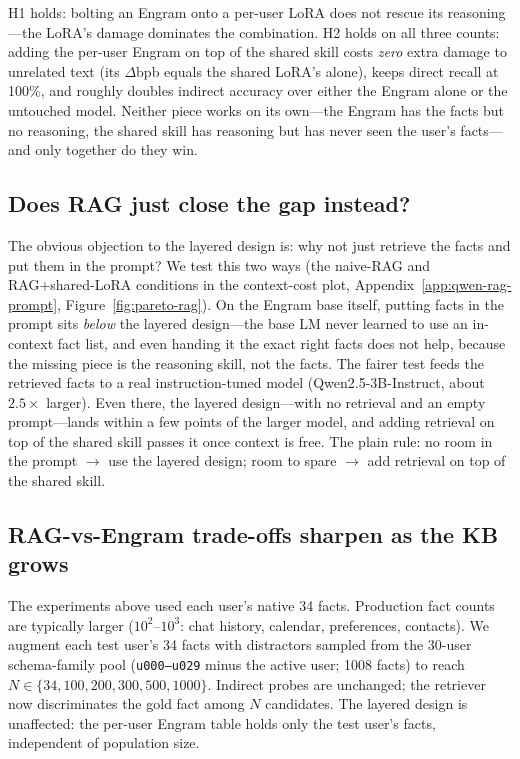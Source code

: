 \documentclass[11pt]{article}
\begin{document}
H1 holds: bolting an Engram onto a per-user LoRA does not rescue its
reasoning---the LoRA's damage dominates the combination. H2 holds on
all three counts: adding the per-user Engram on top of the shared
skill costs \emph{zero} extra damage to unrelated text (its
$\Delta$bpb equals the shared LoRA's alone), keeps direct recall at
100\%, and roughly doubles indirect accuracy over either the Engram
alone or the untouched model. Neither piece works on its own---the
Engram has the facts but no reasoning, the shared skill has reasoning
but has never seen the user's facts---and only together do they win.

\subsection{Does RAG just close the gap instead?}
\label{sec:layered-rag}
\label{sec:qwen-rag}

The obvious objection to the layered design is: why not just
retrieve the facts and put them in the prompt? We test this two ways
(the naive-RAG and RAG+shared-LoRA conditions in the context-cost
plot, Appendix~\ref{app:qwen-rag-prompt}, Figure~\ref{fig:pareto-rag}). On
the Engram base itself, putting facts in the prompt sits
\emph{below} the layered design---the base LM never learned to use
an in-context fact list, and even
handing it the exact right facts does not help, because the missing
piece is the reasoning skill, not the facts. The fairer test feeds the
retrieved facts to a real instruction-tuned model
(Qwen2.5-3B-Instruct, about $2.5\times$ larger). Even there, the
layered design---with no retrieval and an empty prompt---lands within
a few points of the larger model, and adding retrieval on top of the
shared skill passes it once context is free. The plain rule: no
room in the prompt $\to$ use the layered design; room to spare $\to$
add retrieval on top of the shared skill.

\subsection{RAG-vs-Engram trade-offs sharpen as the KB grows}
\label{sec:rag-scale}

The experiments above used each user's native 34 facts. Production fact counts are
typically larger ($10^2$--$10^3$: chat history, calendar,
preferences, contacts). We augment each test user's 34 facts
with distractors sampled from the 30-user schema-family pool
(\texttt{u000--u029} minus the active user; 1008 facts) to reach
$N \in \{34, 100, 200, 300, 500, 1000\}$. Indirect probes are
unchanged; the retriever now discriminates the gold fact among
$N$ candidates. The layered design is unaffected: the per-user
Engram table holds only the test user's facts, independent of
population size.
\end{document}
